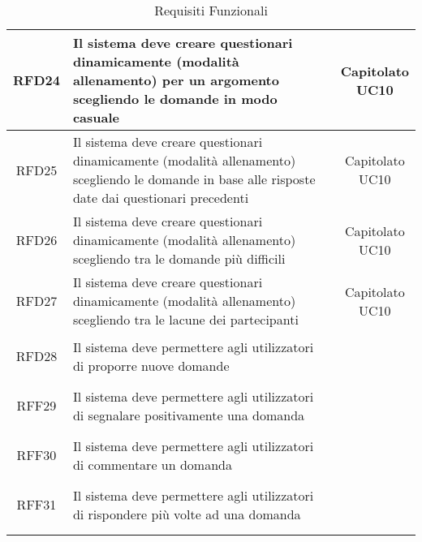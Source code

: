 \begin{longtable}{|c|>{\centering}m{7cm}|c|}
			 \hypertarget{{RFD24}}{{RFD24}} & Il sistema deve creare questionari dinamicamente (modalità allenamento) per un argomento scegliendo le domande in modo casuale & \makecell{Capitolato\\ UC10 } \\ \hline
			 \hypertarget{{RFD25}}{{RFD25}} & Il sistema deve creare questionari dinamicamente (modalità allenamento) scegliendo le domande in base alle risposte date dai questionari precedenti & \makecell{Capitolato\\ UC10 } \\ \hline
			 \hypertarget{{RFD26}}{{RFD26}} & Il sistema deve creare questionari dinamicamente (modalità allenamento) scegliendo tra le domande più difficili & \makecell{Capitolato\\ UC10 } \\ \hline
			 \hypertarget{{RFD27}}{{RFD27}} & Il sistema deve creare questionari dinamicamente (modalità allenamento) scegliendo tra le lacune dei partecipanti & \makecell{Capitolato\\ UC10 } \\ \hline
			 \hypertarget{{RFD28}}{{RFD28}} & Il sistema deve permettere agli utilizzatori di proporre nuove domande & \makecell{Capitolato } \\ \hline
			 \hypertarget{{RFF29}}{{RFF29}} & Il sistema deve permettere agli utilizzatori di segnalare positivamente una domanda & \makecell{Capitolato } \\ \hline
			 \hypertarget{{RFF30}}{{RFF30}} & Il sistema deve permettere agli utilizzatori di commentare un domanda & \makecell{Capitolato } \\ \hline
			 \hypertarget{{RFF31}}{{RFF31}} & Il sistema deve permettere agli utilizzatori di rispondere più volte ad una domanda & \makecell{Capitolato} \\ \hline
\caption[Requisiti Funzionali]{Requisiti Funzionali}
\label{tabella:req0}
\end{longtable}
\clearpage
